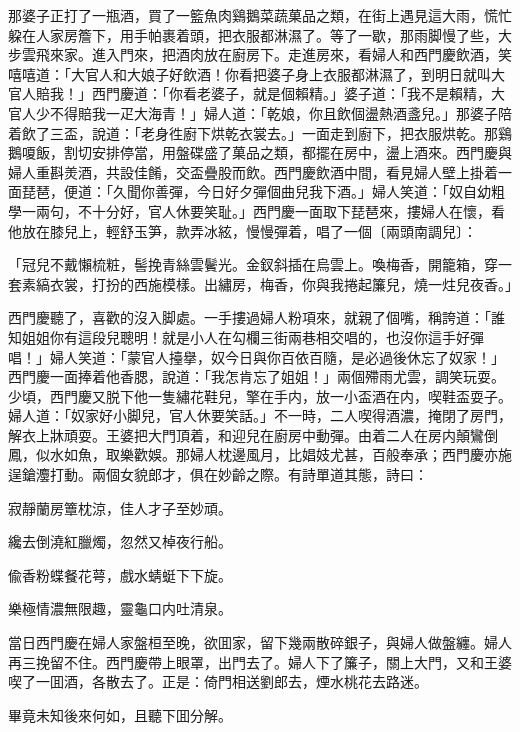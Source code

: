 那婆子正打了一瓶酒，買了一籃魚肉鷄鵝菜蔬菓品之類，在街上遇見這大雨，慌忙躱在人家房簷下，用手帕裹着頭，把衣服都淋濕了。等了一歇，那雨脚慢了些，大步雲飛來家。進入門來，把酒肉放在廚房下。走進房來，看婦人和西門慶飲酒，笑嘻嘻道：「大官人和大娘子好飲酒！你看把婆子身上衣服都淋濕了，到明日就叫大官人賠我！」西門慶道：「你看老婆子，就是個賴精。」婆子道：「我不是賴精，大官人少不得賠我一疋大海青！」婦人道：「乾娘，你且飲個盪熱酒盞兒。」那婆子陪着飲了三盃，說道：「老身徃廚下烘乾衣裳去。」一面走到廚下，把衣服烘乾。那鷄鵝嗄飯，割切安排停當，用盤碟盛了菓品之類，都擺在房中，盪上酒來。西門慶與婦人重斟羙酒，共設佳餚，交盃疊股而飲。西門慶飲酒中間，看見婦人壁上掛着一面琵琶，便道：「久聞你善彈，今日好夕彈個曲兒我下酒。」婦人笑道：「奴自幼粗學一兩句，不十分好，官人休要笑耻。」西門慶一面取下琵琶來，摟婦人在懷，看他放在膝兒上，輕舒玉笋，款弄冰絃，慢慢彈着，唱了一個〔兩頭南調兒〕：
\begin{myquote}
「冠兒不戴懶梳粧，髻挽青絲雲鬢光。金釵斜插在烏雲上。喚梅香，開籠箱，穿一套素縞衣裳，打扮的西施模樣。出繡房，梅香，你與我捲起簾兒，燒一炷兒夜香。」
\end{myquote}

西門慶聽了，喜歡的沒入脚處。一手摟過婦人粉項來，就親了個嘴，稱誇道：「誰知姐姐你有這段兒聰明！就是小人在勾欄三街兩巷相交唱的，也沒你這手好彈唱！」婦人笑道：「蒙官人擡擧，奴今日與你百依百隨，是必過後休忘了奴家！」西門慶一面捧着他香腮，說道：「我怎肯忘了姐姐！」兩個殢雨尤雲，調笑玩耍。少頃，西門慶又脱下他一隻繡花鞋兒，擎在手内，放一小盃酒在内，喫鞋盃耍子。婦人道：「奴家好小脚兒，官人休要笑話。」不一時，二人喫得酒濃，掩閉了房門，解衣上牀頑耍。王婆把大門頂着，和迎兒在廚房中動彈。由着二人在房内顛鸞倒鳳，似水如魚，取樂歡娛。那婦人枕邊風月，比娼妓尤甚，百般奉承；西門慶亦施逞鎗灋打動。兩個女貌郎才，俱在妙齡之際。有詩單道其態，詩曰：
\begin{myquote}
寂靜蘭房簟枕涼，佳人才子至妙頑。

纔去倒澆紅臘燭，忽然又棹夜行船。

偸香粉蝶餐花萼，戲水蜻蜓下下旋。

樂極情濃無限趣，靈龜口内吐清泉。
\end{myquote}

當日西門慶在婦人家盤桓至晚，欲囬家，留下幾兩散碎銀子，與婦人做盤纏。婦人再三挽留不住。西門慶帶上眼罩，出門去了。婦人下了簾子，關上大門，又和王婆喫了一囬酒，各散去了。正是：倚門相送劉郎去，煙水桃花去路迷。

畢竟未知後來何如，且聽下囬分解。

